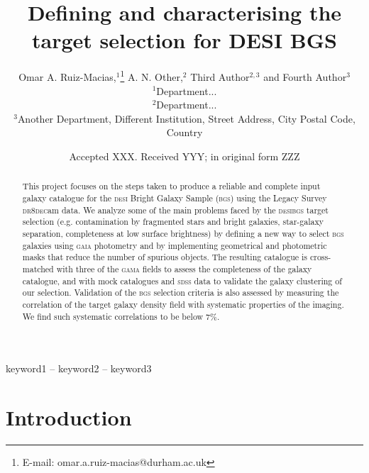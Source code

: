 \documentclass[fleqn,usenatbib]{mnras}
\title[Short title, max. 45 characters]{Defining and characterising the target selection for DESI BGS}
\author[Omar A. Ruiz-Macias et al.]{
Omar A. Ruiz-Macias,$^{1}$\thanks{E-mail: omar.a.ruiz-macias@durham.ac.uk}
A. N. Other,$^{2}$
Third Author$^{2,3}$
and Fourth Author$^{3}$
\\
$^{1}$Department...\\
$^{2}$Department...\\
$^{3}$Another Department, Different Institution, Street Address, City Postal Code, Country
}
\date{Accepted XXX. Received YYY; in original form ZZZ}
\newcommand{\BGS}{\textsc{bgs}\xspace}
\newcommand{\DECam}{\textsc{dec}am\xspace}
\newcommand{\DESI}{\textsc{desi}\xspace}
\newcommand{\DReight}{\textsc{dr8}\xspace}
\newcommand{\GAMA}{\textsc{gama}\xspace}
\newcommand{\GAIA}{\textsc{gaia}\xspace}
\newcommand{\SDSS}{\textsc{sdss}\xspace}
\begin{document}
\label{firstpage}
\pagerange{\pageref{firstpage}--\pageref{lastpage}}
\maketitle

\begin{abstract}
This project focuses on the steps taken to produce a reliable and complete input galaxy catalogue for the \DESI Bright Galaxy Sample (\BGS) using the Legacy Survey \DReight \DECam data. We analyze some of the main problems faced by the \DESI \BGS target selection 
(e.g. contamination by fragmented stars and bright galaxies, star-galaxy separation, completeness at low surface brightness) by defining a new way to select \BGS galaxies using \GAIA photometry and by implementing geometrical and photometric masks that reduce the number of spurious objects. The resulting catalogue is cross-matched with three of the \GAMA fields to assess the completeness of the galaxy catalogue, and with mock catalogues and \SDSS data to validate the galaxy clustering of our selection. Validation of the \BGS selection criteria is also assessed by measuring the correlation of the target galaxy density field with systematic properties of the imaging.  We find such systematic correlations to be below $7\%$.
\end{abstract}



\begin{keywords}
keyword1 -- keyword2 -- keyword3
\end{keywords}



\section{Introduction}\label{sec:intro} %
\end{document}
